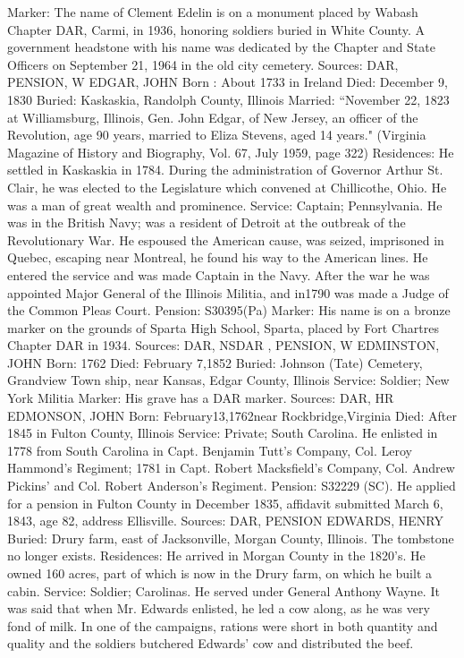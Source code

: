 Marker: The name of Clement Edelin is on a monument placed by Wabash Chapter DAR, Carmi, in 1936, honoring soldiers buried in White County. A government headstone with his name was dedicated by the Chapter and State Officers on September 21, 1964 in the old city cemetery. 
Sources: DAR, PENSION, W 
EDGAR, JOHN 
Born : About 1733 in Ireland 
Died: December 9, 1830 
Buried: Kaskaskia, Randolph County, Illinois 
Married: “November 22, 1823 at Williamsburg, Illinois, Gen. John Edgar, of New Jersey, an officer of the Revolution, age 90 years, married to Eliza Stevens, aged 14 years." (Virginia Magazine of History and Biography, Vol. 67, July 1959, page 322) 
Residences: He settled in Kaskaskia in 1784. During the administration of Gov­ernor Arthur St. Clair, he was elected to the Legislature which convened at Chillicothe, Ohio. He was a man of great wealth and prominence. 
Service: Captain; Pennsylvania. He was in the British Navy; was a resident of Detroit at the outbreak of the Revolutionary War. He espoused the American cause, was seized, imprisoned in Quebec, escaping near Montreal, he found his way to the American lines. He entered the service and was made Captain in the Navy. After the war he was appointed Major General of the Illinois Militia, and in1790 was made a Judge of the Common Pleas Court. 
Pension: S30395(Pa) Marker: His name is on a bronze marker on the grounds of Sparta High School, Sparta, placed by Fort Chartres Chapter DAR in 1934. 
Sources: DAR, NSDAR , PENSION, W 
EDMINSTON, JOHN Born: 1762 
Died: February 7,1852 
Buried: Johnson (Tate) Cemetery, Grandview Town ship, near Kansas, Edgar County, Illinois 
Service: Soldier; New York Militia 
Marker: His grave has a DAR marker. Sources: DAR, HR 
EDMONSON, JOHN Born: February13,1762near Rockbridge,Virginia 
Died: After 1845 in Fulton County, Illinois 
Service: Private; South Carolina. He enlisted in 1778 from South Carolina in Capt. Benjamin Tutt's Company, Col. Leroy Hammond's Regiment; 1781 in Capt. Robert Macksfield's Company, Col. Andrew Pickins' and Col. Robert Anderson's Regiment. 
Pension: S32229 (SC). He applied for a pension in Fulton County in December 1835, affidavit submitted March 6, 1843, age 82, address Ellisville. 
Sources: DAR, PENSION 
EDWARDS, HENRY 
Buried: Drury farm, east of Jacksonville, Morgan County, Illinois. The tombstone no longer exists. 
Residences: He arrived in Morgan County in the 1820's. He owned 160 acres, part of which is now in the Drury farm, on which he built a cabin. 
Service: Soldier; Carolinas. He served under General Anthony Wayne. It was said that when Mr. Edwards enlisted, he led a cow along, as he was very fond of milk. In one of the campaigns, rations were short in both quantity and quality and the soldiers butchered Edwards' cow and distributed the beef. 
